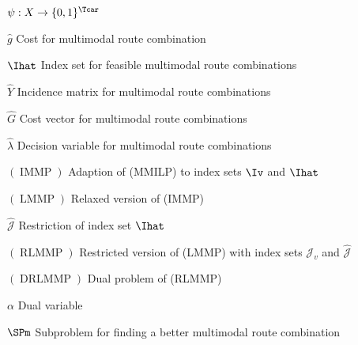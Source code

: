 \begin{labeling}{$\psi:X\to\{0,1\}^{\Tcar}$}
	\item[$\hat{g}$]{Cost for multimodal route combination}
	\item[$\Ihat$]{Index set for feasible multimodal route combinations}
	\item[$\hat{Y}$]{Incidence matrix for multimodal route combinations}
	\item[$\hat{G}$]{Cost vector for multimodal route combinations}
	\item[$\hat{\lambda}$]{Decision variable for multimodal route combinations}
	\item[$(\operatorname{IMMP})$]{Adaption of (MMILP) to index sets $\Iv$ and $\Ihat$}
	\item[$(\operatorname{LMMP})$]{Relaxed version of (IMMP)}
	\item[$\hat{\mathcal{J}}$]{Restriction of index set $\Ihat$}
	\item[$(\operatorname{RLMMP})$]{Restricted version of (LMMP) with index sets $\mathcal{J}_v$ and $\hat{\mathcal{J}}$}
	\item[$(\operatorname{DRLMMP})$]{Dual problem of (RLMMP)}
	\item[$\alpha$]{Dual variable}
	\item[$\SPm$]{Subproblem for finding a better multimodal route combination}
\end{labeling}		
